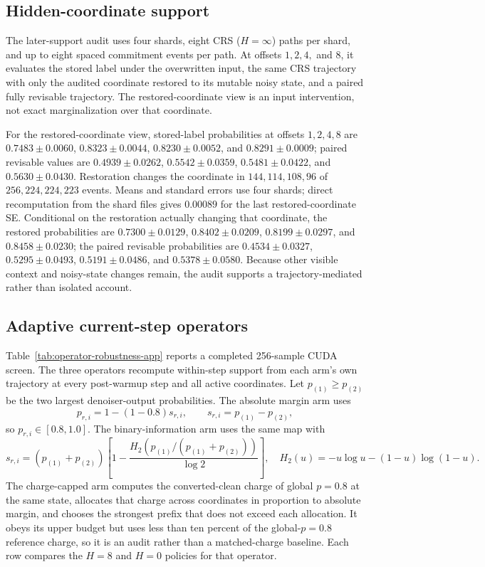 \documentclass{article}
\newcommand{\1}{\mathbf 1}
\newcommand{\CRS}{\textsc{CRS}}
\theoremstyle{definition}
\begin{document}
\subsection{Hidden-coordinate support}

The later-support audit uses four shards, eight \CRS{} ($H=\infty$) paths per
shard, and up to eight spaced commitment events per path. At offsets $1,2,4,$
and $8$, it evaluates the stored label under the overwritten input, the same
\CRS{} trajectory with only the audited coordinate restored to its mutable
noisy state, and a paired fully revisable trajectory. The restored-coordinate
view is an input intervention, not exact marginalization over that coordinate.

For the restored-coordinate view, stored-label probabilities at offsets
$1,2,4,8$ are $0.7483\pm0.0060$, $0.8323\pm0.0044$, $0.8230\pm0.0052$, and
$0.8291\pm0.0009$; paired revisable values are $0.4939\pm0.0262$,
$0.5542\pm0.0359$, $0.5481\pm0.0422$, and $0.5630\pm0.0430$. Restoration changes the
coordinate in $144,114,108,96$ of $256,224,224,223$ events. Means and standard
errors use four shards; direct recomputation from the shard files gives
$0.00089$ for the last restored-coordinate SE. Conditional on the restoration
actually changing that coordinate, the restored probabilities are
$0.7300\pm0.0129$, $0.8402\pm0.0209$, $0.8199\pm0.0297$, and
$0.8458\pm0.0230$; the paired revisable probabilities are
$0.4534\pm0.0327$, $0.5295\pm0.0493$, $0.5191\pm0.0486$, and
$0.5378\pm0.0580$. Because other visible context and noisy-state changes
remain, the audit supports a trajectory-mediated rather than isolated account.

\iffalse
\subsection{Adaptive current-step operators}

Table~\ref{tab:operator-robustness-app} reports a completed 256-sample CUDA
screen. The three operators recompute within-step support from each arm's own
trajectory at every post-warmup step and all active coordinates. Let
$p_{(1)}\ge p_{(2)}$ be the two largest denoiser-output probabilities. The absolute
margin arm uses
\begin{equation}
 p_{r,i}=1-(1-0.8)s_{r,i},
 \qquad s_{r,i}=p_{(1)}-p_{(2)},
 \label{eq:adaptive-margin-app}
\end{equation}
so $p_{r,i}\in[0.8,1.0]$. The binary-information arm uses the same map with
\begin{equation}
 s_{r,i}=(p_{(1)}+p_{(2)})
 \left[1-\frac{H_2\!\left(p_{(1)}/(p_{(1)}+p_{(2)})\right)}{\log 2}\right],
 \quad H_2(u)=-u\log u-(1-u)\log(1-u).
 \label{eq:adaptive-binary-app}
\end{equation}
The charge-capped arm computes the converted-clean charge of global $p=0.8$ at
the same state, allocates that charge across coordinates in proportion to
absolute margin, and chooses the strongest prefix that does not exceed each
allocation. It obeys its upper budget but uses less than ten percent of the
global-$p=0.8$ reference charge, so it is an audit rather than a matched-charge
baseline. Each row compares the $H=8$ and $H=0$ policies for that operator.
\end{document}
